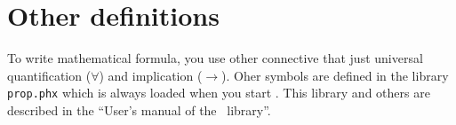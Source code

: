 
\section{Other definitions}

To write mathematical formula, you use other connective that just
universal quantification ($\forall$) and implication ($\to$). Oher
symbols are defined in the library \verb~prop.phx~ which is always
loaded when you start \AFD. This library and others are described in
the ``User's manual of the \AFD\ library''.

